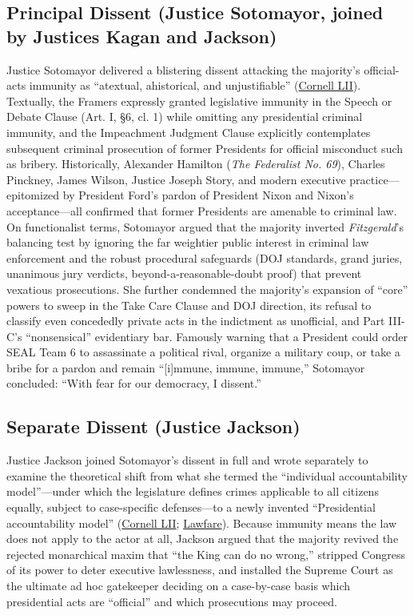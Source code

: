 \documentclass[12pt]{article}
\begin{document}
\subsection{Principal Dissent (Justice Sotomayor, joined by Justices Kagan and Jackson)}

Justice Sotomayor delivered a blistering dissent attacking the majority's official-acts immunity as ``atextual, ahistorical, and unjustifiable'' (\href{https://www.law.cornell.edu/supremecourt/text/23-939}{Cornell LII}). Textually, the Framers expressly granted legislative immunity in the Speech or Debate Clause (Art. I, \S 6, cl. 1) while omitting any presidential criminal immunity, and the Impeachment Judgment Clause explicitly contemplates subsequent criminal prosecution of former Presidents for official misconduct such as bribery. Historically, Alexander Hamilton (\textit{The Federalist No. 69}), Charles Pinckney, James Wilson, Justice Joseph Story, and modern executive practice---epitomized by President Ford's pardon of President Nixon and Nixon's acceptance---all confirmed that former Presidents are amenable to criminal law. On functionalist terms, Sotomayor argued that the majority inverted \textit{Fitzgerald}'s balancing test by ignoring the far weightier public interest in criminal law enforcement and the robust procedural safeguards (DOJ standards, grand juries, unanimous jury verdicts, beyond-a-reasonable-doubt proof) that prevent vexatious prosecutions. She further condemned the majority's expansion of ``core'' powers to sweep in the Take Care Clause and DOJ direction, its refusal to classify even concededly private acts in the indictment as unofficial, and Part III-C's ``nonsensical'' evidentiary bar. Famously warning that a President could order SEAL Team 6 to assassinate a political rival, organize a military coup, or take a bribe for a pardon and remain ``[i]mmune, immune, immune,'' Sotomayor concluded: ``With fear for our democracy, I dissent.''

\subsection{Separate Dissent (Justice Jackson)}

Justice Jackson joined Sotomayor's dissent in full and wrote separately to examine the theoretical shift from what she termed the ``individual accountability model''---under which the legislature defines crimes applicable to all citizens equally, subject to case-specific defenses---to a newly invented ``Presidential accountability model'' (\href{https://www.law.cornell.edu/supremecourt/text/23-939}{Cornell LII}; \href{https://www.lawfaremedia.org/article/the-supreme-court-s-presidential-immunity-decision}{Lawfare}). Because immunity means the law does not apply to the actor at all, Jackson argued that the majority revived the rejected monarchical maxim that ``the King can do no wrong,'' stripped Congress of its power to deter executive lawlessness, and installed the Supreme Court as the ultimate ad hoc gatekeeper deciding on a case-by-case basis which presidential acts are ``official'' and which prosecutions may proceed.
\end{document}
